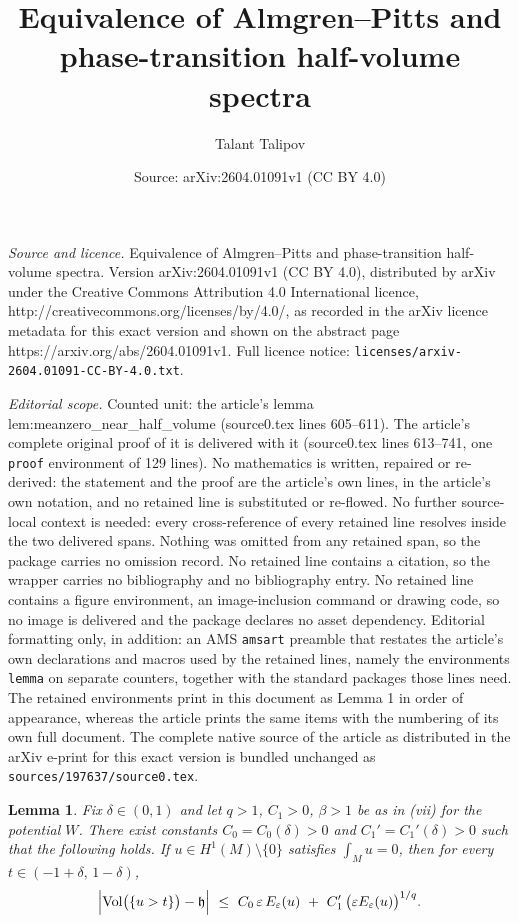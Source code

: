 \documentclass[10pt,a4paper]{amsart}
\title{Equivalence of Almgren--Pitts and phase-transition half-volume spectra}
\author{Talant Talipov}
\date{Source: arXiv:2604.01091v1 (CC BY 4.0)}
\newtheorem{lemma}{Lemma}
\begin{document}
\maketitle

\noindent\emph{Source and licence.} Equivalence of Almgren--Pitts and phase-transition half-volume spectra. Version arXiv:2604.01091v1 (CC BY 4.0), distributed by arXiv under the Creative Commons Attribution 4.0 International licence, http://creativecommons.org/licenses/by/4.0/, as recorded in the arXiv licence metadata for this exact version and shown on the abstract page https://arxiv.org/abs/2604.01091v1. Full licence notice: \texttt{licenses/arxiv-2604.01091-CC-BY-4.0.txt}.\par\smallskip

\noindent\textit{Editorial scope.} Counted unit: the article's lemma lem:meanzero\_near\_half\_volume (source0.tex lines 605--611). The article's complete original proof of it is delivered with it (source0.tex lines 613--741, one \texttt{proof} environment of 129 lines). No mathematics is written, repaired or re-derived: the statement and the proof are the article's own lines, in the article's own notation, and no retained line is substituted or re-flowed.  No further source-local context is needed: every cross-reference of every retained line resolves inside the two delivered spans.  Nothing was omitted from any retained span, so the package carries no omission record.  No retained line contains a citation, so the wrapper carries no bibliography and no bibliography entry.  No retained line contains a figure environment, an image-inclusion command or drawing code, so no image is delivered and the package declares no asset dependency.  Editorial formatting only, in addition: an AMS \texttt{amsart} preamble that restates the article's own declarations and macros used by the retained lines, namely the environments \texttt{lemma} on separate counters, together with the standard packages those lines need.  The retained environments print in this document as Lemma 1 in order of appearance, whereas the article prints the same items with the numbering of its own full document.  The complete native source of the article as distributed in the arXiv e-print for this exact version is bundled unchanged as \texttt{sources/197637/source0.tex}.
\begin{lemma}\label{lem:meanzero_near_half_volume}
Fix $\delta\in(0,1)$ and let $q>1$, $C_1>0$, $\beta>1$ be as in {\rm (vii)} for the potential $W$. There exist constants $C_0=C_0(\delta)>0$ and $C_1'=C_1'(\delta)>0$ such that the following holds. If $u\in H^{1}(M) \setminus \{0\}$ satisfies $\int_M u =0$, then for every $t\in(-1+\delta,\,1-\delta)$,
\[
\Bigl|\operatorname{Vol}\bigl(\{u>t\}\bigr)-\mathfrak h\Bigr|
\ \le\ C_0\,\varepsilon\,E_\varepsilon(u)\ +\ C_1'\,\bigl(\varepsilon E_\varepsilon(u)\bigr)^{1/q}.
\]
\end{lemma}
\end{document}
